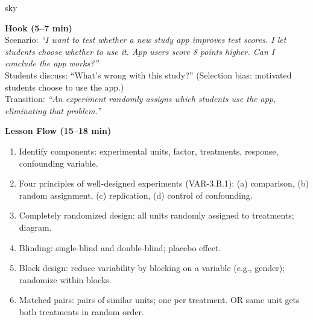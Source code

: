 \documentclass[10pt]{article}
\begin{document}
\begin{skillbox}{sky}
\begin{minipage}[t]{0.48\linewidth}
    \textbf{Hook (5--7 min)}\\
    Scenario: \textit{``I want to test whether a new study app improves test scores.
    I let students choose whether to use it. App users score 8 points higher. Can I
    conclude the app works?''}\\[4pt]
    Students discuss: ``What's wrong with this study?'' (Selection bias: motivated
    students choose to use the app.)\\[4pt]
    Transition: \textit{``An experiment randomly assigns which students use the app,
    eliminating that problem.''}
\end{minipage}
\hfill
\begin{minipage}[t]{0.48\linewidth}
    \textbf{Lesson Flow (15--18 min)}
    \begin{enumerate}
        \item Identify components: experimental units, factor, treatments, response,
              confounding variable.
        \item Four principles of well-designed experiments (VAR-3.B.1):
              (a) comparison, (b) random assignment, (c) replication,
              (d) control of confounding.
        \item Completely randomized design: all units randomly assigned to treatments;
              diagram.
        \item Blinding: single-blind and double-blind; placebo effect.
        \item Block design: reduce variability by blocking on a variable (e.g., gender);
              randomize within blocks.
        \item Matched pairs: pairs of similar units; one per treatment. OR same unit
              gets both treatments in random order.
    \end{enumerate}
\end{minipage}
\end{skillbox}
\end{document}
